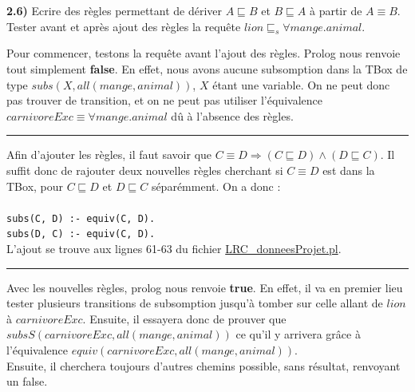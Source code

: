 \documentclass[a4paper,12pt]{report}
\begin{document}

\newpage

{}

\textbf{2.6)} Ecrire des règles permettant de dériver \(A \sqsubseteq B\) et \(B \sqsubseteq A\) à partir de \(A \equiv B\). Tester avant et 
    après ajout des règles la requête \(lion \sqsubseteq_s \forall mange.animal\).



\begin{tcolorbox}[colback=gray!10, colframe=blue!30, coltitle=black, title=Réponse à la question 2.6 - 1/1]

    Pour commencer, testons la requête avant l'ajout des règles. Prolog nous renvoie tout simplement \textbf{false}. En effet, nous avons aucune
        subsomption dans la TBox de type \(subs(X, all(mange, animal))\), \(X\) étant une variable. On ne peut donc pas trouver de transition, et 
        on ne peut pas utiliser l'équivalence \(carnivoreExc \equiv \forall mange.animal\) dû à l'absence des règles.

    \vspace{0.5cm}
    \hrule
    \vspace{0.5cm}

    Afin d'ajouter les règles, il faut savoir que \(C \equiv D \Rightarrow (C \sqsubseteq D) \land (D \sqsubseteq C)\). Il suffit donc de rajouter
        deux nouvelles règles cherchant si \(C \equiv D\) est dans la TBox, pour \(C \sqsubseteq D\) et \(D \sqsubseteq C\) séparémment. On a donc :\\\\
    \texttt{subs(C, D) :- equiv(C, D).}\\
    \texttt{subs(D, C) :- equiv(C, D).}\\

    L'ajout se trouve aux lignes 61-63 du fichier \href{./src/LRC\_donneesProjet.pl}{LRC\_donneesProjet.pl}.

    \vspace{0.5cm}
    \hrule
    \vspace{0.5cm}

    Avec les nouvelles règles, prolog nous renvoie \textbf{true}. En effet, il va en premier lieu tester plusieurs transitions de subsomption jusqu'à tomber
        sur celle allant de \(lion\) à \(carnivoreExc\). Ensuite, il essayera donc de prouver que \(subsS(carnivoreExc, all(mange, animal))\) ce qu'il y arrivera
        grâce à l'équivalence \(equiv(carnivoreExc, all(mange, animal))\).\\

    Ensuite, il cherchera toujours d'autres chemins possible, sans résultat, renvoyant un false.

\end{tcolorbox}
\end{document}
